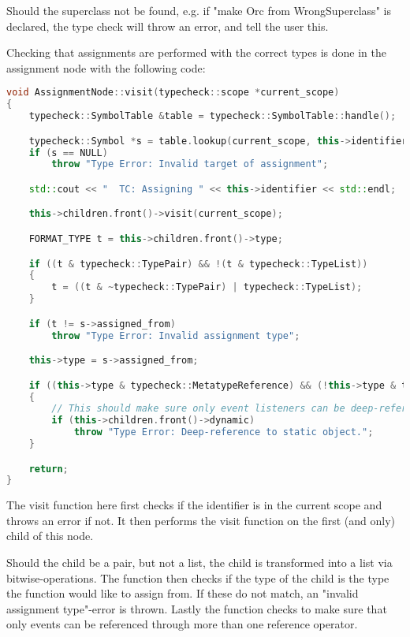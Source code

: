 Should the superclass not be found, e.g. if "make Orc from WrongSuperclass" is declared, the type check will throw an error, and tell the user this.

Checking that assignments are performed with the correct types is done in the assignment node with the following code:

\begin{lstlisting}[language = c++]
void AssignmentNode::visit(typecheck::scope *current_scope)
{
	typecheck::SymbolTable &table = typecheck::SymbolTable::handle();

	typecheck::Symbol *s = table.lookup(current_scope, this->identifier, false);
	if (s == NULL)
		throw "Type Error: Invalid target of assignment";

	std::cout << "  TC: Assigning " << this->identifier << std::endl;

	this->children.front()->visit(current_scope);

	FORMAT_TYPE t = this->children.front()->type;

	if ((t & typecheck::TypePair) && !(t & typecheck::TypeList))
	{
		t = ((t & ~typecheck::TypePair) | typecheck::TypeList);
	}

	if (t != s->assigned_from)
		throw "Type Error: Invalid assignment type";

	this->type = s->assigned_from;

	if ((this->type & typecheck::MetatypeReference) && (!this->type & typecheck::TypeReferenceEvent))
	{
		// This should make sure only event listeners can be deep-referenced.
		if (this->children.front()->dynamic)
			throw "Type Error: Deep-reference to static object.";
	}

	return;
}
\end{lstlisting}
The visit function here first checks if the identifier is in the current scope and throws an error if not. It then performs the visit function on the first (and only) child of this node.

Should the child be a pair, but not a list, the child is transformed into a list via bitwise-operations. The function then checks if the type of the child is the type the function would like to assign from. If these do not match, an "invalid assignment type"-error is thrown. Lastly the function checks to make sure that only events can be referenced through more than one reference operator.

